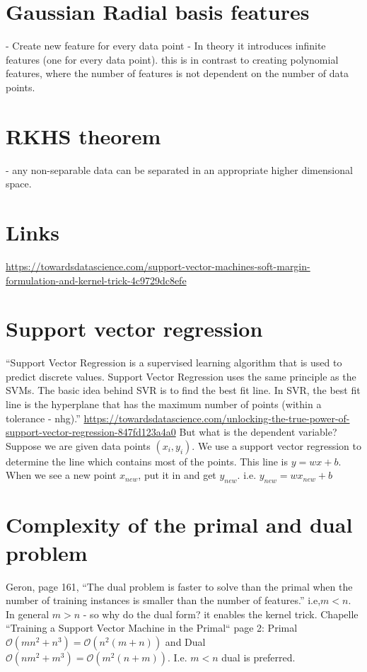 \documentclass{article}
\begin{document}
\section{Gaussian Radial basis features}
- Create new feature for every data point
- In theory it introduces infinite features (one for every data point). this is in contrast to creating polynomial features, where the number of features is not dependent on the number of data points.

\section{RKHS theorem}
- any non-separable data can be separated in an appropriate higher dimensional space.

\section{Links}
\url{https://towardsdatascience.com/support-vector-machines-soft-margin-formulation-and-kernel-trick-4c9729dc8efe}

\section{Support vector regression}
``Support Vector Regression is a supervised learning algorithm that is used to predict discrete values. Support Vector Regression uses the same principle as the SVMs. The basic idea behind SVR is to find the best fit line. In SVR, the best fit line is the hyperplane that has the maximum number of points (within a tolerance - nhg).'' \url{https://towardsdatascience.com/unlocking-the-true-power-of-support-vector-regression-847fd123a4a0} But what is the dependent variable? Suppose we are given data points $(x_i,y_i)$. We use a support vector regression to determine the line which contains most of the points. This line is $y=wx+b$. When we see a new point $x_{new}$, put it in and get $y_{new}$. i.e. $y_{new} = wx_{new}+b$

\section{Complexity of the primal and dual problem}
Geron, page 161, ``The dual problem is faster to solve than the primal when the number of training instances is smaller than the number of features.'' i.e,$m<n$. In general $m>n$ - so why do the dual form? it enables the kernel trick.
Chapelle ``Training a Support Vector Machine in the Primal`` page 2: Primal $\mathcal{O}(mn^2 + n^3)=\mathcal{O}(n^2(m+n))$ and Dual $\mathcal{O}(nm^2+m^3)=\mathcal{O}(m^2(n+m))$. I.e. $m<n$ dual is preferred.  
\end{document}
